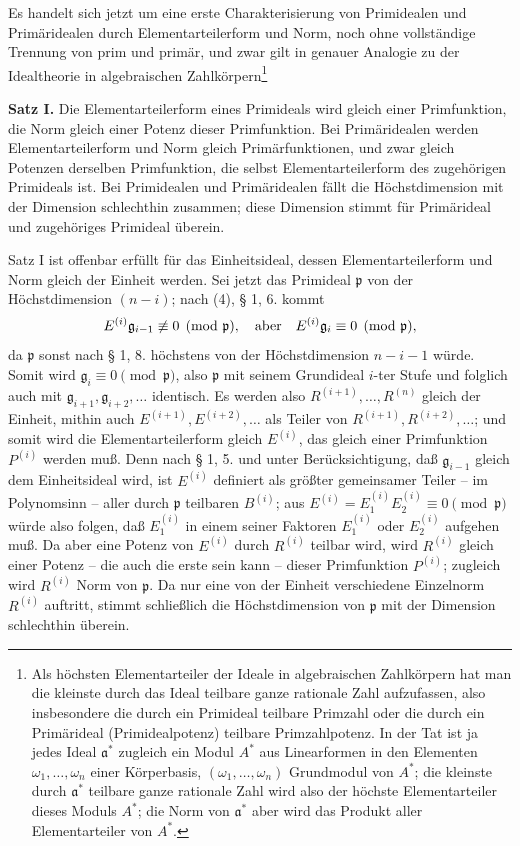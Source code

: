 \documentclass[11pt]{article}
\providecommand{\frakp}{\mathfrak p}
\providecommand{\fraka}{\mathfrak a}
\providecommand{\frakg}{\mathfrak g}
\begin{document}
Es handelt sich jetzt um eine erste Charakterisierung von Primidealen und Primäridealen durch Elementarteilerform und Norm, noch ohne vollständige Trennung von prim und primär, und zwar gilt in genauer Analogie zu der Idealtheorie in algebraischen Zahlkörpern\footnote{Als höchsten Elementarteiler der Ideale in algebraischen Zahlkörpern hat man die kleinste durch das Ideal teilbare ganze rationale Zahl aufzufassen, also insbesondere die durch ein Primideal teilbare Primzahl oder die durch ein Primärideal (Primidealpotenz) teilbare Primzahlpotenz. In der Tat ist ja jedes Ideal $\fraka^*$ zugleich ein Modul $A^*$ aus Linearformen in den Elementen $\omega_1,\ldots,\omega_n$ einer Körperbasis, $(\omega_1,\ldots,\omega_n)$ Grundmodul von $A^*$; die kleinste durch $\fraka^*$ teilbare ganze rationale Zahl wird also der höchste Elementarteiler dieses Moduls $A^*$; die Norm von $\fraka^*$ aber wird das Produkt aller Elementarteiler von $A^*$.}

\textbf{Satz I.} Die Elementarteilerform eines Primideals wird gleich einer Primfunktion, die Norm gleich einer Potenz dieser Primfunktion. Bei Primäridealen werden Elementarteilerform und Norm gleich Primärfunktionen, und zwar gleich Potenzen derselben Primfunktion, die selbst Elementarteilerform des zugehörigen Primideals ist. Bei Primidealen und Primäridealen fällt die Höchstdimension mit der Dimension schlechthin zusammen; diese Dimension stimmt für Primärideal und zugehöriges Primideal überein.

Satz I ist offenbar erfüllt für das Einheitsideal, dessen Elementarteilerform und Norm gleich der Einheit werden. Sei jetzt das Primideal $\frakp$ von der Höchstdimension $(n-i)$; nach (4), § 1, 6. kommt
\[
 E^{(i)}\frakg_{i-1}\not\equiv0\pmod{\frakp},\quad\hbox{aber}\quad
 E^{(i)}\frakg_i\equiv0\pmod{\frakp},
\]
da $\frakp$ sonst nach § 1, 8. höchstens von der Höchstdimension $n-i-1$ würde. Somit wird $\frakg_i\equiv0\pmod{\frakp}$, also $\frakp$ mit seinem Grundideal $i$-ter Stufe und folglich auch mit $\frakg_{i+1},\frakg_{i+2},\ldots$ identisch. Es werden also $R^{(i+1)},\ldots,R^{(n)}$ gleich der Einheit, mithin auch $E^{(i+1)},E^{(i+2)},\ldots$ als Teiler von $R^{(i+1)},R^{(i+2)},\ldots$; und somit wird die Elementarteilerform gleich $E^{(i)}$, das gleich einer Primfunktion $P^{(i)}$ werden muß. Denn nach § 1, 5. und unter Berücksichtigung, daß $\frakg_{i-1}$ gleich dem Einheitsideal wird, ist $E^{(i)}$ definiert als größter gemeinsamer Teiler -- im Polynomsinn -- aller durch $\frakp$ teilbaren $B^{(i)}$; aus $E^{(i)}=E_1^{(i)}E_2^{(i)}\equiv0\pmod{\frakp}$ würde also folgen, daß $E_1^{(i)}$ in einem seiner Faktoren $E_1^{(i)}$ oder $E_2^{(i)}$ aufgehen muß. Da aber eine Potenz von $E^{(i)}$ durch $R^{(i)}$ teilbar wird, wird $R^{(i)}$ gleich einer Potenz -- die auch die erste sein kann -- dieser Primfunktion $P^{(i)}$; zugleich wird $R^{(i)}$ Norm von $\frakp$. Da nur eine von der Einheit verschiedene Einzelnorm $R^{(i)}$ auftritt, stimmt schließlich die Höchstdimension von $\frakp$ mit der Dimension schlechthin überein.
\end{document}
